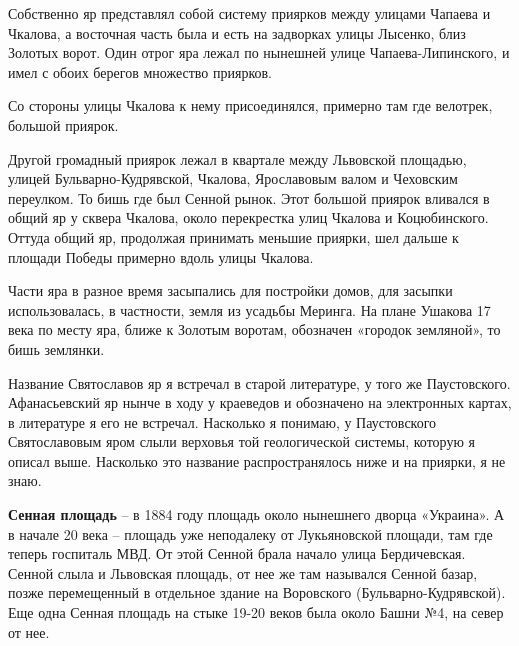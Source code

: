 Собственно яр представлял собой систему приярков между улицами Чапаева и Чкалова, а восточная часть была и есть на задворках улицы Лысенко, близ Золотых ворот. Один отрог яра лежал по нынешней улице Чапаева-Липинского, и имел с обоих берегов множество приярков. 

Со стороны улицы Чкалова к нему присоединялся, примерно там где велотрек, большой приярок. 

Другой громадный приярок лежал в квартале между Львовской площадью, улицей Бульв\-арно-Кудрявской, Чкалова, Ярославовым валом и Чеховским переулком. То бишь где был Сенной рынок. Этот большой приярок вливался в общий яр у сквера Чкалова, около перекрестка улиц Чкалова и Коцюбинского. Оттуда общий яр, продолжая принимать меньшие приярки, шел дальше к площади Победы примерно вдоль улицы Чкалова.

Части яра в разное время засыпались для постройки домов, для засыпки использовалась, в частности, земля из усадьбы Меринга. На плане Ушакова 17 века по месту яра, ближе к Золотым воротам, обозначен «городок земляной», то бишь землянки.  

Название Святославов яр я встречал в старой литературе, у того же Паустовского. Афанасьевский яр нынче в ходу у краеведов и обозначено на электронных картах, в литературе я его не встречал. Насколько я понимаю, у Паустовского Святославовым яром слыли верховья той геологической системы, которую я описал выше. Насколько это название распространялось ниже и на приярки, я не знаю.\\

\medskip


\textbf{Сенная площадь} – в 1884 году площадь около нынешнего дворца «Украина». А в начале 20 века – площадь уже неподалеку от Лукьяновской площади, там где теперь госпиталь МВД. От этой Сенной брала начало улица Бердичевская. Сенной слыла и Львовская площадь, от нее же там назывался Сенной базар, позже перемещенный в отдельное здание на Воровского (Бульварно-Кудрявской). Еще одна Сенная площадь на стыке 19-20 веков была около Башни №4, на север от нее.\\ 

\medskip

